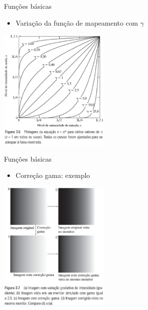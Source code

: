       \begin{slide}[toc=]{Funções básicas}
      \begin{itemize}
       \item Variação da função de mapeamento com $\gamma$
      \end{itemize}

         \begin{center}
                  \includegraphics[width=0.4\textwidth]{figs/fig0306}
               \end{center}
         
       \end{slide}
       
      \begin{slide}[toc=]{Funções básicas}
      \begin{itemize}
       \item Correção gama: exemplo
      \end{itemize}
         \begin{center}
                  \includegraphics[width=0.4\textwidth]{figs/fig0307}
               \end{center}
         
       \end{slide}
       
